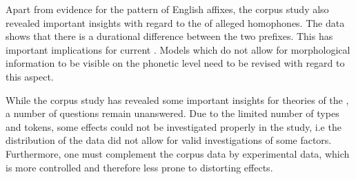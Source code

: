 Apart from evidence for the  pattern of English affixes, the corpus study also revealed important insights with regard to the  of alleged homophones. The data shows that there is a durational difference between the two prefixes. This has important implications for current . Models which do not allow for morphological information to be visible on the phonetic level need to be revised with regard to this aspect.

While the corpus study has revealed some important insights for theories of the , a number of questions remain  unanswered. Due to the limited number of types and tokens, some effects could not be investigated properly in the study, i.e the distribution of the data did not allow for valid investigations of some factors. Furthermore, one must complement the corpus data by experimental data, which is more controlled and therefore less prone to distorting effects.
